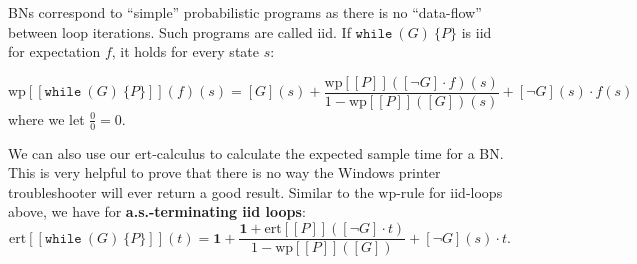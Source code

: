 \documentclass[english]{panikzettel}
\newcommand{\stmtWhile}[2]{\texttt{while}~(#1)~\{ #2 \}}
\renewcommand{\wp}{\mathrm{wp}}
\newcommand{\ert}{\mathrm{ert}}
\begin{document}
BNs correspond to ``simple'' probabilistic programs as there is no ``data-flow'' between loop iterations. Such programs are called iid. If $\stmtWhile{G}{P}$ is iid for expectation $f$, it holds for every state $s$:

\[
	\wp[\![\stmtWhile{G}{P}]\!](f)(s) = [G](s) + \frac{\wp[\![P]\!]([\neg G] \cdot f)(s)}{1 - \wp[\![P]\!]([G])(s)} + [\neg G](s) \cdot f(s)
\]
where we let $\frac{0}{0}=0$.

We can also use our $\ert$-calculus to calculate the expected sample time for a BN.
This is very helpful to prove that there is no way the Windows printer troubleshooter will ever return a good result.
Similar to the $\wp$-rule for iid-loops above, we have for \textbf{a.s.-terminating iid loops}:
\[
	\ert[\![\stmtWhile{G}{P}]\!](t) = \mathbf{1} + \frac{\mathbf{1} + \ert[\![P]\!]([\neg G] \cdot t)}{1 - \wp[\![P]\!]([G])} + [\neg G](s) \cdot t.
\]
\end{document}
